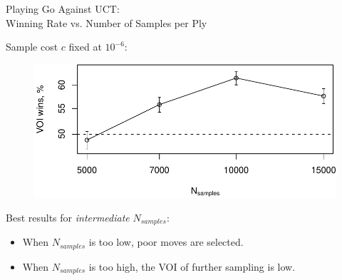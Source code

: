 \documentclass{beamer}
\begin{document}
\begin{frame}{Playing Go Against UCT:
    \\\hspace{1em} Winning Rate vs. Number of Samples per Ply}

Sample cost $c$ fixed at $10^{-6}$:
\begin{figure}
  \centering
  \includegraphics[scale=0.65]{voi-wins.pdf}
\end{figure}
Best results for {\it intermediate} $N_{samples}$:
\begin{itemize}
\item When $N_{samples}$ is too low, poor moves are selected.
\item When $N_{samples}$ is too high, the VOI of further sampling
  is low.
\end{itemize}
\end{frame}
\end{document}
